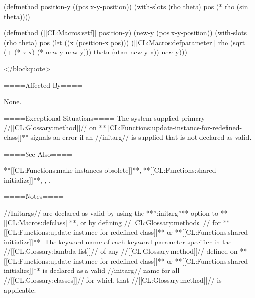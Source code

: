 (defmethod position-y ((pos x-y-position)) (with-slots (rho theta) pos (* rho (sin theta))))

(defmethod ([[CL:Macros:setf]] position-y) (new-y (pos x-y-position)) (with-slots (rho theta) pos (let ((x (position-x pos))) ([[CL:Macros:defparameter]] rho (sqrt (+ (* x x) (* new-y new-y))) theta (atan new-y x)) new-y)))

</blockquote>

====Affected By====

None.

====Exceptional Situations==== The system-supplied primary //[[CL:Glossary:method]]// on **[[CL:Functions:update-instance-for-redefined-class]]** signals an error if an //initarg// is supplied that is not declared as valid.

====See Also====

**[[CL:Functions:make-instances-obsolete]]**, **[[CL:Functions:shared-initialize]]**, {\secref\ClassReDef}, {\secref\InitargRules}, {\secref\DeclaringInitargValidity}

====Notes====

//Initargs// are declared as valid by using the **'':initarg''** option to **[[CL:Macros:defclass]]**, or by defining //[[CL:Glossary:methods]]// for **[[CL:Functions:update-instance-for-redefined-class]]** or **[[CL:Functions:shared-initialize]]**. The keyword name of each keyword parameter specifier in the //[[CL:Glossary:lambda list]]// of any //[[CL:Glossary:method]]// defined on **[[CL:Functions:update-instance-for-redefined-class]]** or **[[CL:Functions:shared-initialize]]** is declared as a valid //initarg// name for all //[[CL:Glossary:classes]]// for which that //[[CL:Glossary:method]]// is applicable.


